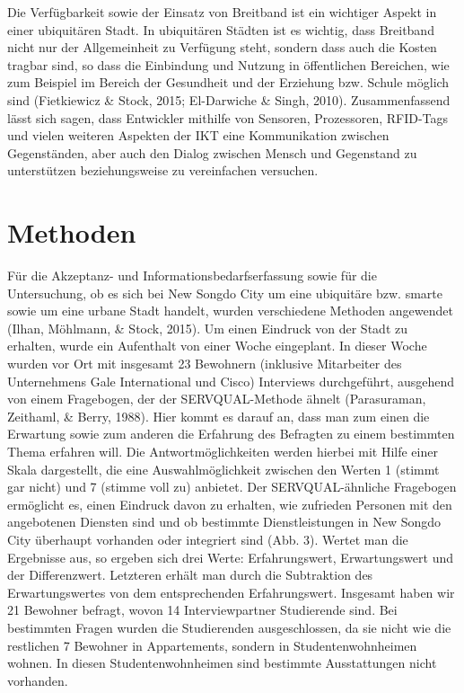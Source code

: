\documentclass[a4paper,
fontsize=11pt,
oneside,
numbers=noperiodatend,
parskip=half-,
bibliography=totoc,
final
]{scrartcl}
\begin{document}
Die Verfügbarkeit sowie der Einsatz von Breitband ist ein wichtiger
Aspekt in einer ubiquitären Stadt. In ubiquitären Städten ist es
wichtig, dass Breitband nicht nur der Allgemeinheit zu Verfügung steht,
sondern dass auch die Kosten tragbar sind, so dass die Einbindung und
Nutzung in öffentlichen Bereichen, wie zum Beispiel im Bereich der
Gesundheit und der Erziehung bzw. Schule möglich sind (Fietkiewicz \&
Stock, 2015; El-Darwiche \& Singh, 2010). Zusammenfassend lässt sich
sagen, dass Entwickler mithilfe von Sensoren, Prozessoren, RFID-Tags und
vielen weiteren Aspekten der IKT eine Kommunikation zwischen
Gegenständen, aber auch den Dialog zwischen Mensch und Gegenstand zu
unterstützen beziehungsweise zu vereinfachen versuchen.

\section*{Methoden}\label{methoden}

Für die Akzeptanz- und Informationsbedarfserfassung sowie für die
Untersuchung, ob es sich bei New Songdo City um eine ubiquitäre bzw.
smarte sowie um eine urbane Stadt handelt, wurden verschiedene Methoden
angewendet (Ilhan, Möhlmann, \& Stock, 2015). Um einen Eindruck von der
Stadt zu erhalten, wurde ein Aufenthalt von einer Woche eingeplant. In
dieser Woche wurden vor Ort mit insgesamt 23 Bewohnern (inklusive
Mitarbeiter des Unternehmens Gale International und Cisco) Interviews
durchgeführt, ausgehend von einem Fragebogen, der der SERVQUAL-Methode
ähnelt (Parasuraman, Zeithaml, \& Berry, 1988). Hier kommt es darauf an,
dass man zum einen die Erwartung sowie zum anderen die Erfahrung des
Befragten zu einem bestimmten Thema erfahren will. Die
Antwortmöglichkeiten werden hierbei mit Hilfe einer Skala dargestellt,
die eine Auswahlmöglichkeit zwischen den Werten 1 (stimmt gar nicht) und
7 (stimme voll zu) anbietet. Der SERVQUAL-ähnliche Fragebogen ermöglicht
es, einen Eindruck davon zu erhalten, wie zufrieden Personen mit den
angebotenen Diensten sind und ob bestimmte Dienstleistungen in New
Songdo City überhaupt vorhanden oder integriert sind (Abb. 3). Wertet
man die Ergebnisse aus, so ergeben sich drei Werte: Erfahrungswert,
Erwartungswert und der Differenzwert. Letzteren erhält man durch die
Subtraktion des Erwartungswertes von dem entsprechenden Erfahrungswert.
Insgesamt haben wir 21 Bewohner befragt, wovon 14 Interviewpartner
Studierende sind. Bei bestimmten Fragen wurden die Studierenden
ausgeschlossen, da sie nicht wie die restlichen 7 Bewohner in
Appartements, sondern in Studentenwohnheimen wohnen. In diesen
Studentenwohnheimen sind bestimmte Ausstattungen nicht vorhanden.
\end{document}
